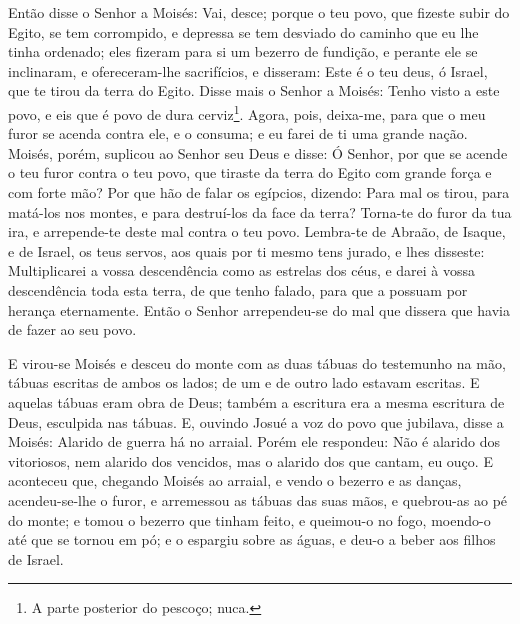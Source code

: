 Então disse o Senhor a Moisés: Vai, desce; porque o teu povo, que
fizeste subir do Egito, se tem corrompido, e depressa se tem
desviado do caminho que eu lhe tinha ordenado; eles fizeram para si
um bezerro de fundição, e perante ele se inclinaram, e
ofereceram-lhe sacrifícios, e disseram: Este é o teu deus, ó Israel,
que te tirou da terra do Egito. Disse mais o Senhor a Moisés:
Tenho visto a este povo, e eis que é povo de dura cerviz\footnote{A
parte posterior do pescoço; nuca.}. Agora, pois, deixa-me,
para que o meu furor se acenda contra ele, e o consuma; e eu farei
de ti uma grande nação. Moisés, porém, suplicou ao Senhor seu
Deus e disse: Ó Senhor, por que se acende o teu furor contra o teu
povo, que tiraste da terra do Egito com grande força e com forte
mão? Por que hão de falar os egípcios, dizendo: Para mal os
tirou, para matá-los nos montes, e para destruí-los da face da
terra? Torna-te do furor da tua ira, e arrepende-te deste mal contra
o teu povo. Lembra-te de Abraão, de Isaque, e de Israel, os
teus servos, aos quais por ti mesmo tens jurado, e lhes disseste:
Multiplicarei a vossa descendência como as estrelas dos céus, e
darei à vossa descendência toda esta terra, de que tenho falado,
para que a possuam por herança eternamente. Então o Senhor
arrependeu-se do mal que dissera que havia de fazer ao seu povo.

E virou-se Moisés e desceu do monte com as duas tábuas do
testemunho na mão, tábuas escritas de ambos os lados; de um e de
outro lado estavam escritas. E aquelas tábuas eram obra de
Deus; também a escritura era a mesma escritura de Deus, esculpida
nas tábuas. E, ouvindo Josué a voz do povo que jubilava,
disse a Moisés: Alarido de guerra há no arraial. Porém ele
respondeu: Não é alarido dos vitoriosos, nem alarido dos vencidos,
mas o alarido dos que cantam, eu ouço. E aconteceu que,
chegando Moisés ao arraial, e vendo o bezerro e as danças,
acendeu-se-lhe o furor, e arremessou as tábuas das suas mãos, e
quebrou-as ao pé do monte; e tomou o bezerro que tinham
feito, e queimou-o no fogo, moendo-o até que se tornou em pó; e o
espargiu sobre as águas, e deu-o a beber aos filhos de Israel.

